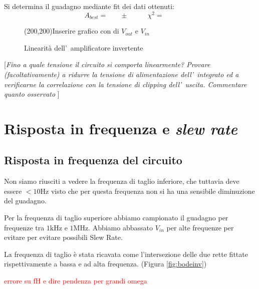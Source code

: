 \documentclass[10pt,a4paper]{article}
\newcommand{\rem}[1]{[\emph{#1}]}
\newcommand{\exn}{\phantom{xxx}}
\begin{document}
	Si determina il guadagno mediante fit dei dati ottenuti:
	\[
	A_{best} = \exn \pm \exn \quad  \chi^2 = \exn
	\]
	\begin{figure}[t]
		\begin{center}
			\framebox(200,200){Inserire grafico con di $V_{out}$ e $V_{in}$}
		\end{center}
		\caption{\small Linearit\`a dell'~amplificatore invertente}
		\label{fig:lin}
	\end{figure}
	
	\rem{Fino a quale tensione il circuito si comporta linearmente? Provare (facoltativamente) a ridurre la 
		tensione di alimentazione dell'~integrato ed a verificarne la correlazione con la tensione di 
		\emph{clipping} dell'~uscita. Commentare quanto osservato }
	
	\section{Risposta in frequenza e \emph{slew rate}}
	\subsection{Risposta in frequenza del circuito}
	Non siamo riusciti a vedere la frequenza di taglio inferiore, che tuttavia deve essere   $ <10\mathrm{Hz}$ visto che per questa frequenza  non si ha una sensibile diminuzione del guadagno.

 Per la frequenza di taglio superiore abbiamo campionato il guadagno per frequenze tra $1\mathrm{kHz}$ e $ 1\mathrm{MHz}.$
Abbiamo abbassato $V_{in}$ per alte frequenze per evitare per evitare  possibili Slew Rate.

La frequenza di taglio è stata ricavata come l'intersezione delle due rette fittate rispettivamente a bassa e ad alta frequenza.
(Figura \ref{fig:bodeinv})

\textcolor{red}{errore su fH e dire pendenza per grandi omega}
\end{document}
